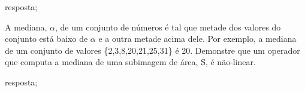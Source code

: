 \documentclass[12pt,a4paper]{article}
\begin{document}
\begin{solution}
    \task resposta;
\end{solution}

\begin{question}{1}
A mediana, $\alpha$, de um conjunto de números é tal que metade dos valores do
conjunto está baixo de $\alpha$ e a outra metade acima dele. Por exemplo, a
mediana de um conjunto de valores \{2,3,8,20,21,25,31\} é 20. Demonstre que um
operador que computa a mediana de uma subimagem de área, S, é não-linear.
\end{question}

\begin{solution}
    \task resposta;
\end{solution}











\pagebreak
\medskip
\printbibliography[
    heading=bibintoc,
    title={Referências Bibliográficas}
]
\end{document}
